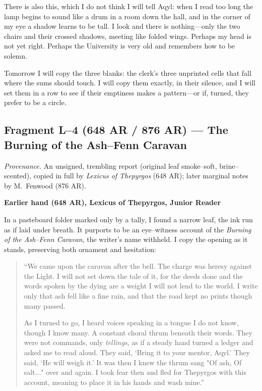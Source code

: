 \documentclass[11pt]{article}
\numberwithin{equation}{section} %
\theoremstyle{plain} %
\theoremstyle{definition} %
\theoremstyle{remark} %
\begin{document}
There is also this, which I do not think I will tell Aqyl: when I read too long the lamp begins to sound like a drum in a room down the hall, and in the corner of my eye a shadow learns to be tall. I look and there is nothing—only the two chairs and their crossed shadows, meeting like folded wings. Perhaps my head is not yet right. Perhaps the University is very old and remembers how to be solemn.

Tomorrow I will copy the three blanks: the clerk’s three unprinted cells that fall where the sums should touch. I will copy them exactly, in their silence, and I will set them in a row to see if their emptiness makes a pattern—or if, turned, they prefer to be a circle.

\subsection{Fragment L--4 (648 AR / 876 AR) — The Burning of the Ash–Fenn Caravan}
\label{frag:l4}

\noindent\textit{Provenance.} An unsigned, trembling report (original leaf smoke–soft, brine–scented), copied in full by \textit{Lexicus of Thepyrgos} (648 AR); later marginal notes by M.\ Fenwood (876 AR).

\medskip
\noindent\textbf{Earlier hand (648 AR), Lexicus of Thepyrgos, Junior Reader}

In a pasteboard folder marked only by a tally, I found a narrow leaf, the ink run as if laid under breath. It purports to be an eye–witness account of the \textit{Burning of the Ash–Fenn Caravan}, the writer’s name withheld. I copy the opening as it stands, preserving both ornament and hesitation:

\begin{quote}\small
“We came upon the caravan after the bell. The charge was heresy against the Light. I will not set down the tale of it, for the deeds done and the words spoken by the dying are a weight I will not lend to the world. I write only that ash fell like a fine rain, and that the road kept no prints though many passed.

As I turned to go, I heard voices speaking in a tongue I do not know, though I know many. A constant choral thrum beneath their words. They were not commands, only \emph{tellings}, as if a steady hand turned a ledger and asked me to read aloud. They said, ‘Bring it to your mentor, Aqyl.’ They said, ‘He will weigh it.’ It was then I knew the thrum sang "Of ash, Of salt..." over and again. I took fear then and fled for Thepyrgos with this account, meaning to place it in his hands and wash mine.”
\end{quote}
\end{document}
